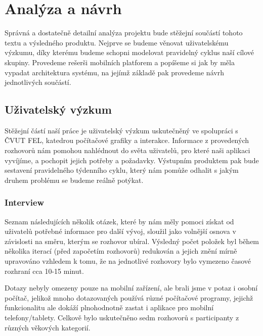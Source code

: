 \documentclass[thesis=M,czech]{FITthesis}[2012/06/26]
\begin{document}
\chapter{Analýza a návrh}
Správná a dostatečně detailní analýza projektu bude stěžejní součástí tohoto textu a výsledného produktu. Nejprve se budeme věnovat uživatelskému výzkumu, díky kterému budeme schopni modelovat pravidelný cyklus naší cílové skupiny. Provedeme rešerši mobilních platforem a popíšeme si jak by měla vypadat architektura systému, na jejímž základě pak provedeme návrh jednotlivých součástí.

\section{Uživatelský výzkum}
Stěžejní částí naší práce je uživatelský výzkum uskutečněný ve spolupráci s ČVUT FEL, katedrou počítačové grafiky a interakce. Informace z provedených rozhovorů nám pomohou nahlédnout do světa uživatelů, pro které naši aplikaci vyvíjíme, a pochopit jejich potřeby a požadavky. Výstupním produktem pak bude sestavení pravidelného týdenního cyklu, který nám pomůže odhalit s jakým druhem problému se budeme reálně potýkat.

\subsection{Interview}
Seznam následujících několik otázek, které by nám měly pomoci získat od uživatelů potřebné informace pro další vývoj, sloužil jako volnější osnova v závislosti na směru, kterým se rozhovor ubíral. Výsledný počet položek byl během několika iterací (před započetím rozhovorů) redukován a jejich znění mírně upravováno vzhledem k tomu, že na jednotlivé rozhovory bylo vymezeno časové rozhraní cca 10-15 minut.

Dotazy nebyly omezeny pouze na mobilní zařízení, ale brali jsme v potaz i osobní počítač, jelikož mnoho dotazovaných používá různé počítačové programy, jejichž funkcionalitu ale dokáží plnohodnotně zastat i aplikace pro mobilní telefony/tablety. Celkově bylo uskutečněno sedm rozhovorů s participanty z různých věkových kategorií.
\end{document}
